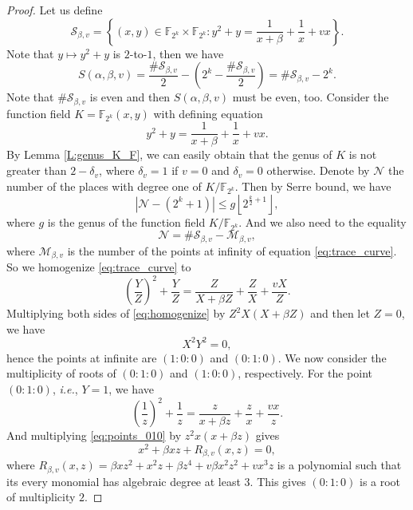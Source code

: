 \documentclass{article}
\newcommand{\F}{\mathbb{F}}
\newcommand{\0}{\textbf{0}}
\newcommand{\1}{\textbf{1}}
\theoremstyle{plain}
\begin{document}
\begin{proof}
        Let us define 
        \[\mathcal{S}_{\beta,v}=\left\{(x,y)\in\F_{2^k}\times\F_{2^k}:y^2+y=\frac{1}{x+\beta}+\frac{1}{x}+vx\right\}.\]
        Note that $ y\mapsto y^2+y $ is $ 2 $-to-$ 1 $, then we have 
        \begin{equation}\label{eq:tracesum_S}
            S(\alpha,\beta,v)=\frac{\#\mathcal{S}_{\beta,v}}{2}-\left(2^k-\frac{\#\mathcal{S}_{\beta,v}}{2}\right)=\#\mathcal{S}_{\beta,v}-2^k.
        \end{equation}
        Note that $ \#\mathcal{S}_{\beta,v} $ is even and then $ S(\alpha,\beta,v) $ must be even, too. 
        Consider the function field $ K=\F_{2^k}(x,y) $ with defining equation 
        \begin{equation}\label{eq:trace_curve}
            y^2+y=\frac{1}{x+\beta}+\frac{1}{x}+vx.
        \end{equation}
        By Lemma \ref{L:genus_K_F}, we can easily obtain that the genus of $ K $ is not greater than $ 2-\delta_v $, 
        where $ \delta_v=1 $ if $ v=0 $ and $ \delta_v=0 $ otherwise. 
        Denote by $ \mathcal{N} $ the number of the places with degree one of $ K/\F_{2^k} $. 
        Then by Serre bound\cite{Serre1982serrebound}, we have 
        \begin{equation}\label{eq:N_genus_inequality}
            \left\lvert \mathcal{N}-(2^k+1)\right\rvert\le g\left\lfloor 2^{\frac{k}{2}+1}\right\rfloor,
        \end{equation}
        where $ g $ is the genus of the function field $ K/\F_{2^k} $. 
        And we also need to the equality 
        \begin{equation}\label{eq:N_S_M_equality}
            \mathcal{N}=\#\mathcal{S}_{\beta,v}-\mathcal{M}_{\beta,v},
        \end{equation}
        where $ \mathcal{M}_{\beta,v} $ is the number of the points at infinity of equation \eqref{eq:trace_curve}. 
        So we homogenize \eqref{eq:trace_curve} to 
        \begin{equation}\label{eq:homogenize}
            \left( \frac{Y}{Z} \right)^2+\frac{Y}{Z}=\frac{Z}{X+\beta Z}+\frac{Z}{X}+\frac{vX}{Z}.
        \end{equation}
        Multiplying both sides of \eqref{eq:homogenize} by $ Z^2X\left( X+\beta Z \right) $ and then let $ Z=0 $, 
        we have 
        \[X^2Y^2=0,\]
        hence the points at infinite are $ (1:0:0) $ and $ (0:1:0) $. 
        We now consider the multiplicity of roots of $ (0 : 1 : 0) $ and $ (1 : 0 : 0) $, respectively. 
        For the point $ (0 : 1 : 0 ) $, \emph{i.e.}, $ Y = 1 $, we have
        \begin{equation}\label{eq:points_010}
            \left( \frac{1}{z} \right)^2+\frac{1}{z}=\frac{z}{x+\beta z}+\frac{z}{x}+\frac{vx}{z}.
        \end{equation}
        And multiplying \eqref{eq:points_010} by $ z^2x(x+\beta z) $ gives 
        \[x^2+\beta xz+R_{\beta,v}(x,z)=0,\]
        where $ R_{\beta,v}(x,z)=\beta xz^2+x^2z+\beta z^4+v\beta x^2z^2+vx^3z $ is a polynomial 
        such that its every monomial has algebraic degree at least $ 3 $. 
        This gives $ (0 : 1 : 0) $ is a root of multiplicity $ 2 $. 
        

\end{proof}
\end{document}
